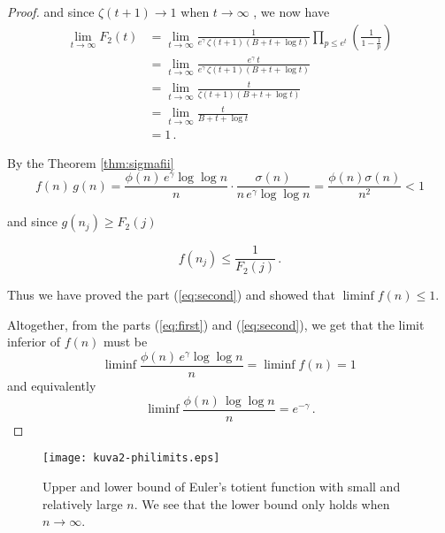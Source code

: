 \documentclass{article}
\begin{document}
\begin{theorem}
\begin{proof}
and since $\zeta(t+1)\rightarrow 1$ when $t\rightarrow\infty$ \cite{HardyWright}, we now have
\begin{align*}
    \lim_{t \rightarrow \infty} F_2(t) & = \lim_{t \rightarrow \infty} \frac{1}{e^\gamma\,\zeta(t+1)(B+t+\log t)} \prod_{p\leq e^t} \left(\frac{1}{1-\frac{1}{p}}\right)\\
    & = \lim_{t \rightarrow \infty} \frac{e^\gamma\,t}{e^\gamma\,\zeta(t+1)(B+t+\log t)}\\
    & = \lim_{t \rightarrow \infty} \frac{t}{\zeta(t+1)(B+t+\log t)}\\
    & = \lim_{t \rightarrow \infty} \frac{t}{B+t+\log t}\\
    & = 1\,.
\end{align*}

By the Theorem \ref{thm:sigmafii}
\begin{equation*}
    f(n)\,g(n) = \frac{\phi(n)\,e^\gamma \log\log n}{n} \cdot \frac{\sigma(n)}{n\,e^\gamma \log\log n} = \frac{\phi(n)\sigma(n)}{n^2}<1
\end{equation*}

and since $g(n_j) \geq F_2(j)$

\begin{equation*}
    f(n_j)\leq \frac{1}{F_2(j)}\,.
\end{equation*}

Thus we have proved the part (\ref{eq:second}) and showed that $\liminf{f(n)\leq 1}$.

Altogether, from the parts (\ref{eq:first}) and (\ref{eq:second}), we get that the limit inferior of $f(n)$ must be
\begin{equation*}
    \liminf{\frac{\phi(n)\,e^\gamma \log\log n}{n}}=\liminf{f(n)}=1\,
\end{equation*}
and equivalently
\begin{equation*}
    \liminf{\frac{\phi(n)\,\log\log n}{n}}=e^{-\gamma}\,.
\end{equation*}
\end{proof}
\end{theorem}

\begin{figure}[!htb]
    \centering
    \texttt{[image: kuva2-philimits.eps]}
    \caption{Upper and lower bound of Euler's totient function with small and relatively large $n$. We see that the lower bound only holds when $n\rightarrow\infty$.}
    \label{fig:k2}
\end{figure}

\clearpage
\nocite{*}
\printbibliography
\end{document}
